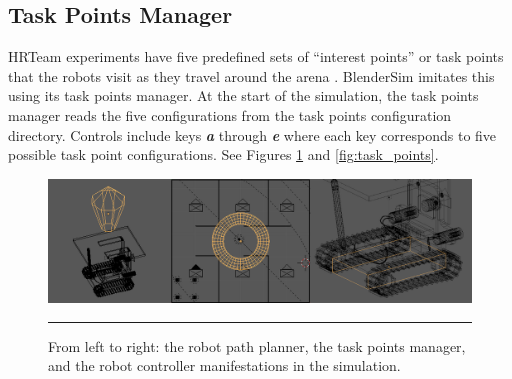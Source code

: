 
\subsection{Task Points Manager}


HRTeam experiments have five predefined sets of ``interest points'' or task points that the robots visit as they travel around the arena \cite{ozgelen-et-al-arms:2013}. BlenderSim imitates this using its task points manager. At the start of the simulation, the task points manager reads the five configurations from the task points configuration directory. Controls include keys \textit{\textbf{a}} through \textit{\textbf{e}} where each key corresponds to five possible task point configurations. See Figures \ref{fig:blendersim_components} and \ref{fig:task_points}. 

\begin{figure}[htbp]
\centering
\includegraphics[scale=0.4]{../Figures/Chapter5/parts.png}
\rule{35em}{0.5pt}
\caption[BlenderSim Components]{From left to right: the robot path planner, the task points manager, and the robot controller manifestations in the simulation.}
\label{fig:blendersim_components}
\end{figure}

